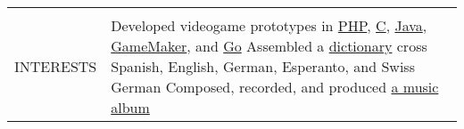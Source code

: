 \documentclass[letterpaper,10pt,oneside]{article}
\newenvironment{body}
{\par\par
\begin{longtable}{p{0.125\textwidth}p{0.84\textwidth}}}
{\par\end{longtable}\par}
\renewcommand{\section}[3]{\\[-0.7cm]\pdfbookmark[2]{#2}{#3}\\%
\raggedleft  %
{\fontsize{9.5pt}{9.5pt}\selectfont\bfseries\raggedright%
\MakeUppercase{#1}}&}
\begin{document}
\begin{body}

\section{Interests}{Interests}{PDF:Interests}

Developed videogame prototypes in \href{https://github.com/lquesada/LifoSource}{PHP}, \href{https://github.com/lquesada/SpaceARMy}{C}, \href{https://github.com/lquesada/RogueCave}{Java}, \href{https://github.com/lquesada/PhysicsEngine}{GameMaker}, and \href{https://github.com/lquesada/Cavernal}{Go} \newline
Assembled a \href{https://github.com/lquesada/Lingvaro}{dictionary} cross Spanish, English, German, Esperanto, and Swiss German \newline
Composed, recorded, and produced \href{https://elezeta.com}{a music album}

\end{body}
\end{document}

